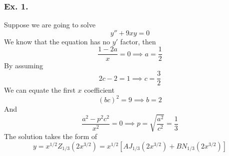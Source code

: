 \documentclass[../../main.tex]{subfiles}
\begin{document}
\subsubsection*{Ex. 1.} Suppose we are going to solve 
\begin{equation*}
  y'' +9xy=0
\end{equation*}
We know that the equation has no $y'$ factor, then 
\begin{equation*}
  \frac{1-2a}{x}=0\implies a=\frac{1}{2}
\end{equation*}
By assuming
\begin{equation*}
  2c-2=1\implies c=\frac{3}{2}
\end{equation*}
We can equate the first $x$ coefficient
\begin{equation*}
  (bc)^2=9\implies b=2
\end{equation*}
And
\begin{equation*}
  \frac{a^2-p^2c^2}{x^2}=0\implies p=\sqrt{\frac{a^2}{c^2}}=\frac{1}{3}
\end{equation*}
The solution takes the form of 
\begin{equation*}
  y=x^{1/2}Z_{1/3}(2x^{3/2})=x^{1/2}\left[AJ_{1/3}(2x^{3/2})+BN_{1/3}(2x^{3/2})\right]
\end{equation*}
\end{document}
